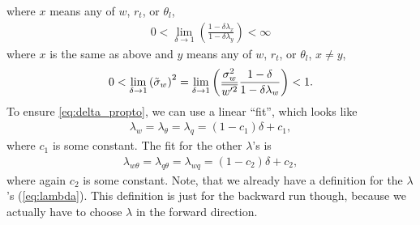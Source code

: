 where $x$ means any of $w$, $r_t$, or $\theta_l$,
\begin{align}
    0 < \lim_{\delta\to 1} \left(\frac{1-\delta\lambda_x}{1-\delta\lambda_y}\right) < \infty
\end{align}
where $x$ is the same as above and $y$ means any of $w$, $r_t$, or $\theta_l$, $x \neq y$,
\begin{align}
    0 < \lim_{\delta \to 1} \left({\tilde{\sigma}_w}\right)^2
    = \lim_{\delta \to 1} \left(\frac{\sigma_w^2}{\overline{w'^2}} \frac{1-\delta}{1-\delta \lambda_w}\right) < 1.
\end{align}
To ensure \cref{eq:delta_propto}, we can use a linear \enquote{fit}, which looks like
\begin{align}
    \label{eq:lambda_fit}
    \lambda_w = \lambda_\theta = \lambda_q
    = (1 - c_1) \delta + c_1,
\end{align}
where $c_1$ is some constant.
The fit for the other $\lambda$'s is
\begin{align}
    \label{eq:lambda_xy_fit}
    \lambda_{w\theta} = \lambda_{q\theta} = \lambda_{wq}
    = (1 - c_2) \delta + c_2,
\end{align}
where again $c_2$ is some constant.
Note, that we already have a definition for the $\lambda$'s (\cref{eq:lambda}).
This definition is just for the backward run though,
because we actually have to choose $\lambda$ in the forward direction.

